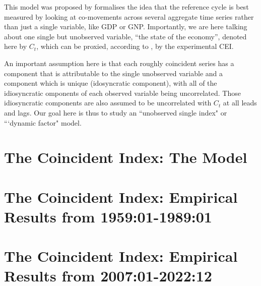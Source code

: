 \documentclass[12pt]{article}
\begin{document}
	\maketitle
	This model was proposed by   formalises the idea that  the reference cycle is best measured  by looking at co-movements  across several aggregate time series rather than just a single variable, like GDP or  GNP. Importantly, we are here talking about one single but unobserved variable, ``the state of the economy'', denoted here by $C_t$, which can be proxied, according to \cite{stock1988probability, stock&watson1989indexes}, by the experimental CEI.
	
	An important assumption here is that each roughly coincident series has a component that is attributable to the single unobserved variable and a component which is unique  (idosyncratic component), with all of the idiosyncratic omponents of each observed variable being uncorrelated. Those idiosyncratic components are also assumed to be uncorrelated with $C_t$ at all leads and lags. Our goal here is thus to study an ``unobserved single index" or ```dynamic factor" model.
	
	\section{The Coincident Index: The Model }
		
	
	\section{The Coincident Index: Empirical Results from 1959:01-1989:01}
		

	\section{The Coincident Index: Empirical Results from 2007:01-2022:12}
		
	


%
%	
%	
	
%	
	\newpage
	
	
\end{document}
